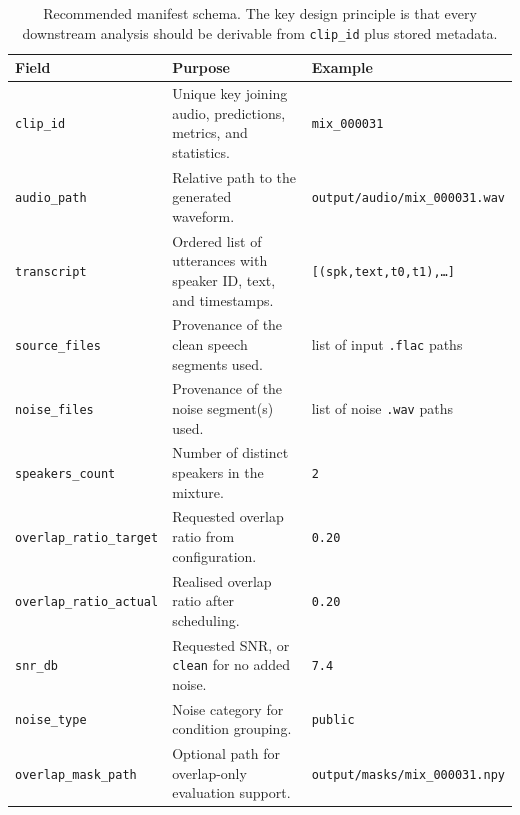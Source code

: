\begin{table}[ht]
\centering
\begin{tabularx}{\linewidth}{|@{}l >{\raggedright\arraybackslash}X >{\raggedright\arraybackslash}X@{}|}
\toprule
\textbf{Field} & \textbf{Purpose} & \textbf{Example} \\
\midrule
\texttt{clip\_id} & Unique key joining audio, predictions, metrics, and statistics. & \texttt{mix\_000031} \\
\hline
\texttt{audio\_path} & Relative path to the generated waveform. & \texttt{output/audio/mix\_000031.wav} \\
\hline
\texttt{transcript} & Ordered list of utterances with speaker ID, text, and timestamps. & \texttt{[(spk,text,t0,t1),\dots]} \\
\hline
\texttt{source\_files} & Provenance of the clean speech segments used. & list of input \texttt{.flac} paths \\
\hline
\texttt{noise\_files} & Provenance of the noise segment(s) used. & list of noise \texttt{.wav} paths \\
\hline
\texttt{speakers\_count} & Number of distinct speakers in the mixture. & \texttt{2} \\
\hline
\texttt{overlap\_ratio\_target} & Requested overlap ratio from configuration. & \texttt{0.20} \\
\hline
\texttt{overlap\_ratio\_actual} & Realised overlap ratio after scheduling. & \texttt{0.20} \\
\hline
\texttt{snr\_db} & Requested SNR, or \texttt{clean} for no added noise. & \texttt{7.4} \\
\hline
\texttt{noise\_type} & Noise category for condition grouping. & \texttt{public} \\
\hline
\texttt{overlap\_mask\_path} & Optional path for overlap-only evaluation support. & \texttt{output/masks/mix\_000031.npy} \\
\bottomrule
\end{tabularx}
\caption{Recommended manifest schema. The key design principle is that every downstream analysis should be derivable from \texttt{clip\_id} plus stored metadata.}
\label{tab:manifest_schema_improved}
\end{table}

